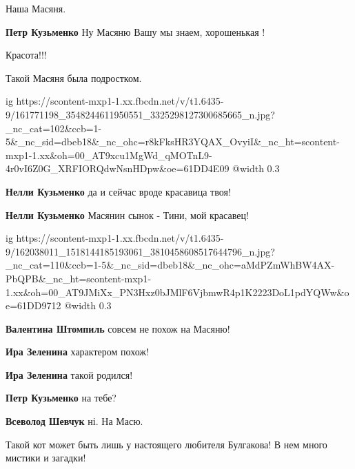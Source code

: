  
 
 
 
 

Наша Масяня.

\textbf{Петр Кузьменко} Ну Масяню Вашу мы знаем, хорошенькая !

Красота!!!

Такой Масяня была подростком.

\ifcmt
  ig https://scontent-mxp1-1.xx.fbcdn.net/v/t1.6435-9/161771198_3548244611950551_3325298127300685665_n.jpg?_nc_cat=102&ccb=1-5&_nc_sid=dbeb18&_nc_ohc=r8kFksHR3YQAX_OvyiI&_nc_ht=scontent-mxp1-1.xx&oh=00_AT9xcu1MgWd_qMOTnL9-4r0vI6Z0G_XRFIORQdwNsnHDpw&oe=61DD4E09
  @width 0.3
\fi

\textbf{Нелли Кузьменко} да и сейчас вроде красавица твоя!

\textbf{Нелли Кузьменко} Масянин сынок - Тини, мой красавец!

\ifcmt
  ig https://scontent-mxp1-1.xx.fbcdn.net/v/t1.6435-9/162038011_1518144185193061_3810458608517644796_n.jpg?_nc_cat=110&ccb=1-5&_nc_sid=dbeb18&_nc_ohc=aMdPZmWhBW4AX-PbQPB&_nc_ht=scontent-mxp1-1.xx&oh=00_AT9JMiXx_PN3Hxz0bJMlF6VjbmwR4p1K2223DoL1pdYQWw&oe=61DD9712
  @width 0.3
\fi

\textbf{Валентина Штомпиль} совсем не похож на Масяню!

\textbf{Ира Зеленина} характером похож!

\textbf{Ира Зеленина} такой родился!

\textbf{Петр Кузьменко} на тебе?

\textbf{Всеволод Шевчук} ні. На Масю.


Такой кот может быть лишь у настоящего любителя Булгакова! В нем много мистики
и загадки!

